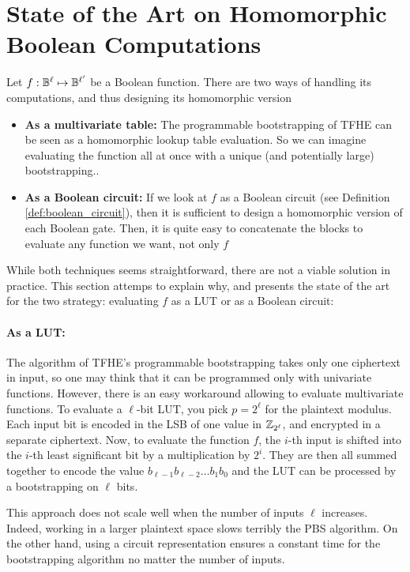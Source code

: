 \section{State of the Art on Homomorphic Boolean Computations}


Let $f : \mathbb{B}^\ell \mapsto \mathbb{B}^{\ell'}$ be a Boolean function. There are two ways of handling its computations, and thus designing its homomorphic version

\begin{itemize}
	\item \textbf{As a multivariate table: } The programmable bootstrapping of TFHE can be seen as a homomorphic lookup table evaluation. So we can imagine evaluating the function all at once with a unique (and potentially large) bootstrapping..
	\item \textbf{As a Boolean circuit: } If we look at $f$ as a Boolean circuit (see Definition \ref{def:boolean_circuit}), then it is sufficient to design a homomorphic version of each Boolean gate. Then, it is quite easy to concatenate the blocks to evaluate any function we want, not only $f$
\end{itemize}


While both techniques seems straightforward, there are not a viable solution in practice. This section attemps to explain why, and presents the state of the art for the two strategy: evaluating $f$ as a LUT or as a Boolean circuit:


\paragraph{As a LUT:}


The algorithm of TFHE's programmable bootstrapping takes only one ciphertext in input, so one may think that it can be programmed only with univariate functions. However, there is an easy workaround allowing to evaluate multivariate functions.
To evaluate a $\ell$-bit LUT, you pick $p = 2^\ell$ for the plaintext modulus. Each input bit is encoded in the LSB of one value in $\mathbb{Z}_{2^\ell}$, and encrypted in a separate ciphertext. Now, to evaluate the function $f$, the $i$-th input is shifted into the $i$-th least significant bit by a multiplication by $2^i$. They are then all summed together to encode the value $b_{\ell-1}b_{\ell-2}\dots b_1b_0$ and the LUT can be processed by a bootstrapping on $\ell$ bits.


This approach does not scale well when the number of inputs $\ell$ increases. Indeed, working in a larger plaintext space slows terribly the PBS algorithm. On the other hand, using a circuit representation ensures a constant time for the bootstrapping algorithm no matter the number of inputs. 


